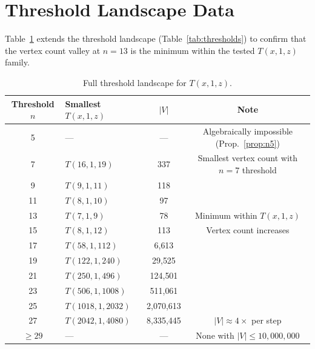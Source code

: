 \section{Threshold Landscape Data}

Table~\ref{tab:landscape_full} extends the threshold landscape
(Table~\ref{tab:thresholds}) to confirm that the vertex count valley
at $n = 13$ is the minimum within the tested $T(x,1,z)$ family.

\begin{table}[H]
\centering
\caption{Full threshold landscape for $T(x,1,z)$.}
\label{tab:landscape_full}
\begin{tabular}{@{}clcc@{}}
  \toprule
  Threshold $n$ & Smallest $T(x,1,z)$ & $|V|$ & Note \\
  \midrule
  5  & ---            & ---    & Algebraically impossible (Prop.~\ref{prop:n5}) \\
  7  & $T(16,1,19)$   & 337    & Smallest vertex count with $n=7$ threshold \\
  9  & $T(9,1,11)$    & 118    & \\
  11 & $T(8,1,10)$    &  97    & \\
  13 & $T(7,1,9)$     &  78    & Minimum within $T(x,1,z)$ \\
  15 & $T(8,1,12)$    & 113    & Vertex count increases \\
  17 & $T(58,1,112)$      & 6{,}613     & \\
  19 & $T(122,1,240)$     & 29{,}525    & \\
  21 & $T(250,1,496)$     & 124{,}501   & \\
  23 & $T(506,1,1008)$    & 511{,}061   & \\
  25 & $T(1018,1,2032)$   & 2{,}070{,}613 & \\
  27 & $T(2042,1,4080)$   & 8{,}335{,}445 & $|V| \approx 4\times$ per step \\
  $\ge 29$ & ---           & ---         & None with $|V| \le 10{,}000{,}000$ \\
  \bottomrule
\end{tabular}
\smallskip

\end{table}
